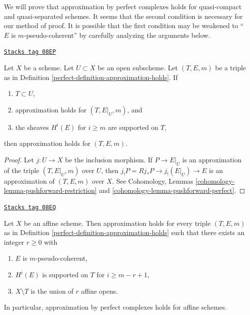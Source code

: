 We will prove that approximation by perfect complexes holds for
quasi-compact and quasi-separated schemes. It seems that the second
condition is necessary for our method of proof. It is possible that the
first condition may be weakened to ``$E$ is $m$-pseudo-coherent''
by carefully analyzing the arguments below.

\begin{lemma}[Open]
\label{perfect-lemma-open}
\href{https://stacks.math.columbia.edu/tag/08EP}{\texttt{Stacks tag 08EP}}

Let $X$ be a scheme. Let $U \subset X$ be an open subscheme.
Let $(T, E, m)$ be a triple as in
Definition \ref{perfect-definition-approximation-holds}.
If
\begin{enumerate}
\item $T \subset U$,
\item approximation holds for $(T, E|_U, m)$, and
\item the sheaves $H^i(E)$ for $i \geq m$ are supported on $T$,
\end{enumerate}
then approximation holds for $(T, E, m)$.
\end{lemma}

\begin{proof}
Let $j : U \to X$ be the inclusion morphism.
If $P \to E|_U$ is an approximation of the triple $(T, E|_U, m)$
over $U$, then $j_!P = Rj_*P \to j_!(E|_U) \to E$ is an approximation
of $(T, E, m)$ over $X$.
See Cohomology, Lemmas \ref{cohomology-lemma-pushforward-restriction} and
\ref{cohomology-lemma-pushforward-perfect}.
\end{proof}

\begin{lemma}
\label{perfect-lemma-approximation-affine}
\href{https://stacks.math.columbia.edu/tag/08EQ}{\texttt{Stacks tag 08EQ}}

Let $X$ be an affine scheme. Then approximation holds for every
triple $(T, E, m)$ as in Definition \ref{perfect-definition-approximation-holds}
such that there exists an integer $r \geq 0$ with
\begin{enumerate}
\item $E$ is $m$-pseudo-coherent,
\item $H^i(E)$ is supported on $T$ for $i \geq m - r + 1$,
\item $X \setminus T$ is the union of $r$ affine opens.
\end{enumerate}
In particular, approximation by perfect complexes holds for affine schemes.
\end{lemma}

